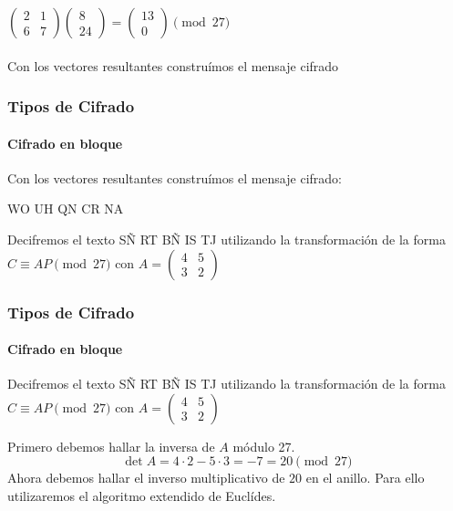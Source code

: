 \documentclass[spanish, mexico]{beamer}
\begin{document}
\begin{frame}
\begin{solution}
		    $
		    \begin{pmatrix}2 & 1\\ 6 & 7\end{pmatrix}
		    \begin{pmatrix}8\\24\end{pmatrix} = \begin{pmatrix}13\\0\end{pmatrix} \pmod{27}
		    $\\~\\
		    Con los vectores resultantes construímos el mensaje cifrado
		 \end{solution}
	\end{frame}
	
	\begin{frame}
		\frametitle{Tipos de Cifrado}
		\framesubtitle{Cifrado en bloque}
		 \begin{solution}
		    Con los vectores resultantes construímos el mensaje cifrado:
		    \begin{center}
		        WO UH QN CR NA
		    \end{center}
		 \end{solution}
		 \begin{example}
		    Decifremos el texto SÑ RT BÑ IS TJ utilizando la transformación de la forma $C \equiv AP \pmod{27}$ con $A = \begin{pmatrix}4 & 5\\ 3 & 2 \end{pmatrix}$
		 \end{example}
	\end{frame}
	
	\begin{frame}
		\frametitle{Tipos de Cifrado}
		\framesubtitle{Cifrado en bloque}
		\begin{example}
		    Decifremos el texto SÑ RT BÑ IS TJ utilizando la transformación de la forma $C \equiv AP \pmod{27}$ con $A = \begin{pmatrix}4 & 5\\ 3 & 2 \end{pmatrix}$
		 \end{example}
		 \begin{solution}
		    Primero debemos hallar la inversa de $A$ módulo 27.
		    $$\det{A} = 4 \cdot 2 - 5 \cdot 3 = -7 = 20 \pmod{27}$$
		    Ahora debemos hallar el inverso multiplicativo de $20$ en el anillo. Para ello utilizaremos el algoritmo extendido de Euclídes.
		 \end{solution}
	\end{frame}
	
\end{document}
